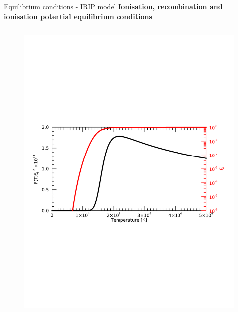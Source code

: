 \documentclass[10pt,aspectratio=169,usenames,dvipsnames]{beamer}
\begin{document}
\begin{frame}{Equilibrium conditions - IRIP model}
\textbf{Ionisation, recombination and ionisation potential equilibrium conditions}
\begin{columns}
\begin{column}{0.45\textwidth}
\begin{figure}
    \centering
    \includegraphics[width=0.95\linewidth,clip=true,trim=0.9cm 8.8cm 0.9cm 8.8cm]{2023StAndrews/Figures/eqltest3.pdf} \\

\end{figure}
\end{column}
\end{columns}
\end{frame}
\end{document}
